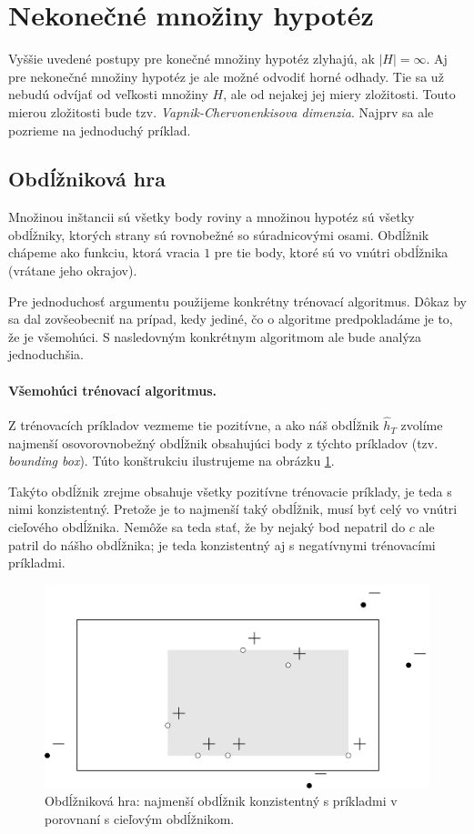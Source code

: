 \section{Nekonečné množiny hypotéz}

Vyššie uvedené postupy pre konečné množiny hypotéz zlyhajú, ak
$|H| = \infty$. Aj pre nekonečné množiny hypotéz je ale možné
odvodiť horné odhady. Tie sa už nebudú odvíjať od veľkosti množiny $H$,
ale od nejakej jej miery zložitosti. Touto mierou zložitosti bude tzv.
\emph{Vapnik-Chervonenkisova dimenzia}. Najprv sa ale pozrieme
na jednoduchý príklad.




\subsection{Obdĺžniková hra}

Množinou inštancii sú všetky body roviny a množinou hypotéz sú všetky
obdĺžniky, ktorých strany sú rovnobežné so súradnicovými osami. Obdĺžnik
chápeme ako funkciu, ktorá vracia $1$ pre tie body, ktoré sú vo vnútri
obdĺžnika (vrátane jeho okrajov).

Pre jednoduchosť argumentu použijeme konkrétny trénovací algoritmus.
Dôkaz by sa dal zovšeobecniť na prípad, kedy jediné, čo o algoritme
predpokladáme je to, že je všemohúci. S nasledovným konkrétnym algoritmom
ale bude analýza jednoduchšia.

\paragraph{Všemohúci trénovací algoritmus.} Z trénovacích príkladov 
vezmeme tie pozitívne, a ako náš obdĺžnik $\hat{h}_T$ zvolíme najmenší
osovorovnobežný obdĺžnik obsahujúci body z týchto príkladov (tzv.
\emph{bounding box}). Túto konštrukciu ilustrujeme na obrázku \ref{rectgame:hath}.

Takýto obdĺžnik zrejme obsahuje všetky pozitívne
trénovacie príklady, je teda s nimi konzistentný. Pretože je to najmenší
taký obdĺžnik, musí byť celý vo vnútri cieľového obdĺžnika. Nemôže sa teda
stať, že by nejaký bod nepatril do $c$ ale patril do nášho obdĺžnika; je
teda konzistentný aj s negatívnymi trénovacími príkladmi.

\begin{figure}
  \centering
  \includegraphics[scale=1]{obrazky/rectgame1.pdf}
  \caption{
    Obdĺžniková hra: najmenší obdĺžnik konzistentný s príkladmi
    v porovnaní s cieľovým obdĺžnikom.
  }
  \label{rectgame:hath}
\end{figure}

